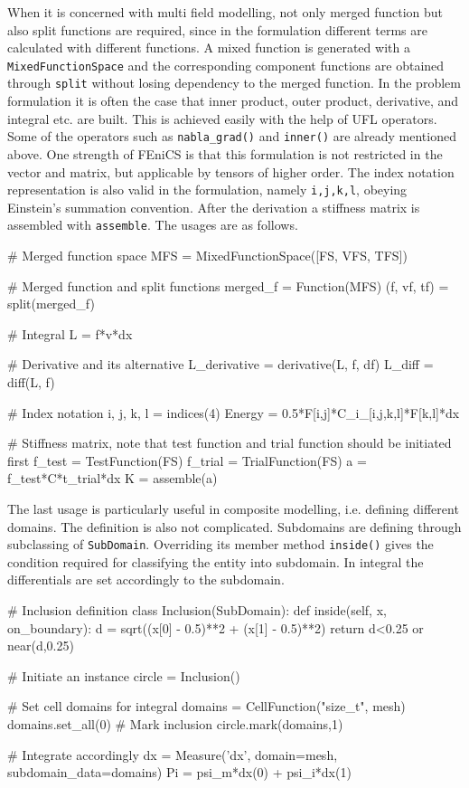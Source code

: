 \documentclass[10pt,a4paper]{scrreprt}
\begin{document}
When it is concerned with multi field modelling, not only merged function but also split functions are required, since in the formulation different terms are calculated with different functions. A mixed function is generated with a \texttt{MixedFunctionSpace} and the corresponding component functions are obtained through \texttt{split} without losing dependency to the merged function. In the problem formulation it is often the case that inner product, outer product, derivative, and integral etc. are built. This is achieved easily with the help of UFL operators. Some of the operators such as \texttt{nabla\_grad()} and \texttt{inner()} are already mentioned above. One strength of FEniCS is that this formulation is not restricted in the vector and matrix, but applicable by tensors of higher order. The index notation representation is also valid in the formulation, namely \texttt{i,j,k,l}, obeying Einstein's summation convention. After the derivation a stiffness matrix is assembled with \texttt{assemble}. The usages are as follows.

\begin{python}
# Merged function space
MFS = MixedFunctionSpace([FS, VFS, TFS])

# Merged function and split functions
merged_f = Function(MFS)
(f, vf, tf) = split(merged_f)

# Integral
L = f*v*dx

# Derivative and its alternative
L_derivative = derivative(L, f, df)
L_diff = diff(L, f)

# Index notation
i, j, k, l = indices(4)
Energy = 0.5*F[i,j]*C_i_[i,j,k,l]*F[k,l]*dx

# Stiffness matrix, note that test function and trial function should be initiated first
f_test = TestFunction(FS)
f_trial = TrialFunction(FS)
a = f_test*C*t_trial*dx
K = assemble(a)
\end{python}

The last usage is particularly useful in composite modelling, i.e. defining different domains. The definition is also not complicated. Subdomains are defining through subclassing of \texttt{SubDomain}. Overriding its member method \texttt{inside()} gives the condition required for classifying the entity into subdomain. In integral the differentials are set accordingly to the subdomain.


\begin{python}
# Inclusion definition
class Inclusion(SubDomain):
    def inside(self, x, on_boundary):
        d = sqrt((x[0] - 0.5)**2 + (x[1] - 0.5)**2)
        return d<0.25 or near(d,0.25)

# Initiate an instance
circle = Inclusion()

# Set cell domains for integral
domains = CellFunction("size_t", mesh)
domains.set_all(0)
# Mark inclusion
circle.mark(domains,1)

# Integrate accordingly
dx = Measure('dx', domain=mesh, subdomain_data=domains)
Pi = psi_m*dx(0) + psi_i*dx(1)
\end{python}
\end{document}
